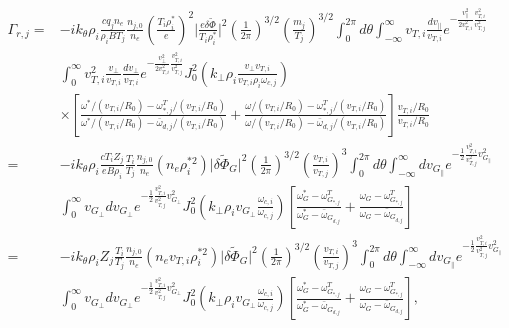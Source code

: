 \documentclass[12pt]{article}
\numberwithin{equation}{subsection}
\begin{document}
   \begin{equation}
   \begin{aligned}
      \Gamma_{r,j} =  &-ik_\theta\rho_i\frac{cq_jn_e}{\rho_iBT_j}\frac{n_{j,0}}{n_e}(\frac{T_i\rho_i^*}{e})^2\lvert\frac{e\delta\widetilde{\Phi}}{T_i\rho_i^*}\rvert^2
                      \left(\frac{1}{2\pi}\right)^{3/2}\left(\frac{m_j}{T_j}\right)^{3/2}\int_{0}^{2\pi}d\theta\int_{-\infty}^{\infty}
                      v_{T,i}\frac{dv_\parallel}{v_{T,i}}e^{-\frac{v_\parallel^2}{2v_{T,i}^2}\frac{v_{T,i}^2}{v_{T,j}^2}}\\
                      &\int_{0}^{\infty}v_{T,i}^2\frac{v_\perp}{v_{T,i}}\frac{dv_\perp}{v_{T,i}}e^{-\frac{v_\perp^2}{2v_{T,i}^2}\frac{v_{T,i}^2}{v_{T,j}^2}}
                      J_0^2(k_\perp\rho_i \frac{v_\perp v_{T,i}}{v_{T,i}\rho_i\omega_{c,j}}) \\
                      &\times[\frac{\omega^*/(v_{T,i}/R_0)-\omega^T_{*,j}/(v_{T,i}/R_0)}{\omega^*/(v_{T,i}/R_0)-\bar{\omega}_{d,j}/(v_{T,i}/R_0)}
                             + \frac{\omega/(v_{T,i}/R_0)-\omega^T_{*,j}/(v_{T,i}/R_0)}{\omega/(v_{T,i}/R_0)-\bar{\omega}_{d,j}/(v_{T,i}/R_0)}]
                       \frac{v_{T,i}/R_0}{v_{T,i}/R_0} \\
                   =  &-ik_\theta\rho_i\frac{cT_iZ_j}{eB\rho_i}\frac{T_i}{T_j}\frac{n_{j,0}}{n_e}(n_e\rho_i^{*2})\lvert\delta\widetilde{\Phi}_G\rvert^2
                       \left(\frac{1}{2\pi}\right)^{3/2}\left(\frac{v_{T,i}}{v_{T,j}}\right)^3\int_{0}^{2\pi}d\theta\int_{-\infty}^{\infty}
                       dv_{G_\parallel}e^{-\frac{1}{2}\frac{v_{T,i}^2}{v_{T,j}^2}{v_{G_\parallel}^2}} \\
                      &\int_{0}^{\infty}v_{G_\perp}dv_{G_\perp}e^{-\frac{1}{2}\frac{v_{T,i}^2}{v_{T,j}^2}v_{G_\perp}^2}
                       J_0^2(k_\perp\rho_iv_{G_\perp}\frac{\omega_{c,i}}{\omega_{c,j}})
                       [\frac{\omega_G^*-\omega^T_{G_{*,j}}}{\omega_G^*-\bar{\omega}_{G_{d,j}}}
                       + \frac{\omega_G-\omega^T_{G_{*,j}}}{\omega_G-\bar{\omega}_{G_{d,j}}}] \\
                   =  &-ik_\theta\rho_iZ_j\frac{T_i}{T_j}\frac{n_{j,0}}{n_e}(n_ev_{T,i}\rho_i^{*2})\lvert\delta\widetilde{\Phi}_G\rvert^2
                       \left(\frac{1}{2\pi}\right)^{3/2}\left(\frac{v_{T,i}}{v_{T,j}}\right)^3\int_{0}^{2\pi}d\theta\int_{-\infty}^{\infty}
                       dv_{G_\parallel}e^{-\frac{1}{2}\frac{v_{T,i}^2}{v_{T,j}^2}{v_{G_\parallel}^2}} \\
                      &\int_{0}^{\infty}v_{G_\perp}dv_{G_\perp}e^{-\frac{1}{2}\frac{v_{T,i}^2}{v_{T,j}^2}v_{G_\perp}^2}
                       J_0^2(k_\perp\rho_iv_{G_\perp}\frac{\omega_{c,i}}{\omega_{c,j}})
                       [\frac{\omega_G^*-\omega^T_{G_{*,j}}}{\omega_G^*-\bar{\omega}_{G_{d,j}}}
                       + \frac{\omega_G-\omega^T_{G_{*,j}}}{\omega_G-\bar{\omega}_{G_{d,j}}}], \\
   \end{aligned}
   \end{equation}
\end{document}

